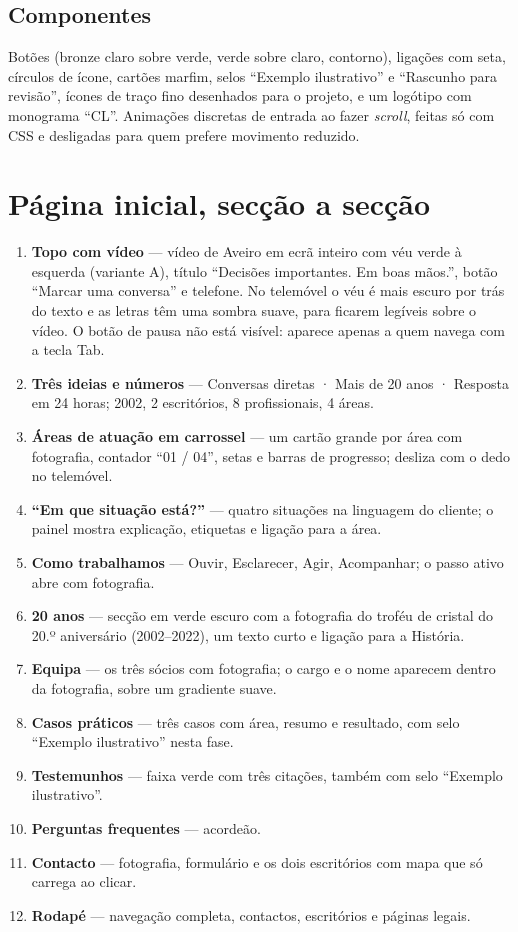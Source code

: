 \documentclass[11pt,a4paper]{article}
\begin{document}
\subsection{Componentes}
Botões (bronze claro sobre verde, verde sobre claro, contorno), ligações com seta, círculos de ícone,
cartões marfim, selos ``Exemplo ilustrativo'' e ``Rascunho para revisão'', ícones de traço fino
desenhados para o projeto, e um logótipo com monograma ``CL''. Animações discretas de entrada ao fazer
\textit{scroll}, feitas só com CSS e desligadas para quem prefere movimento reduzido.

\section{Página inicial, secção a secção}\label{sec:home}

\begin{enumerate}
  \item \textbf{Topo com vídeo} --- vídeo de Aveiro em ecrã inteiro com véu verde à esquerda (variante A), título ``Decisões importantes. Em boas mãos.'', botão ``Marcar uma conversa'' e telefone. No telemóvel o véu é mais escuro por trás do texto e as letras têm uma sombra suave, para ficarem legíveis sobre o vídeo. O botão de pausa não está visível: aparece apenas a quem navega com a tecla Tab.
  \item \textbf{Três ideias e números} --- Conversas diretas · Mais de 20 anos · Resposta em 24 horas; 2002, 2 escritórios, 8 profissionais, 4 áreas.
  \item \textbf{Áreas de atuação em carrossel} --- um cartão grande por área com fotografia, contador ``01 / 04'', setas e barras de progresso; desliza com o dedo no telemóvel.
  \item \textbf{``Em que situação está?''} --- quatro situações na linguagem do cliente; o painel mostra explicação, etiquetas e ligação para a área.
  \item \textbf{Como trabalhamos} --- Ouvir, Esclarecer, Agir, Acompanhar; o passo ativo abre com fotografia.
  \item \textbf{20 anos} --- secção em verde escuro com a fotografia do troféu de cristal do 20.º aniversário (2002--2022), um texto curto e ligação para a História.
  \item \textbf{Equipa} --- os três sócios com fotografia; o cargo e o nome aparecem dentro da fotografia, sobre um gradiente suave.
  \item \textbf{Casos práticos} --- três casos com área, resumo e resultado, com selo ``Exemplo ilustrativo'' nesta fase.
  \item \textbf{Testemunhos} --- faixa verde com três citações, também com selo ``Exemplo ilustrativo''.
  \item \textbf{Perguntas frequentes} --- acordeão.
  \item \textbf{Contacto} --- fotografia, formulário e os dois escritórios com mapa que só carrega ao clicar.
  \item \textbf{Rodapé} --- navegação completa, contactos, escritórios e páginas legais.
\end{enumerate}
\end{document}
